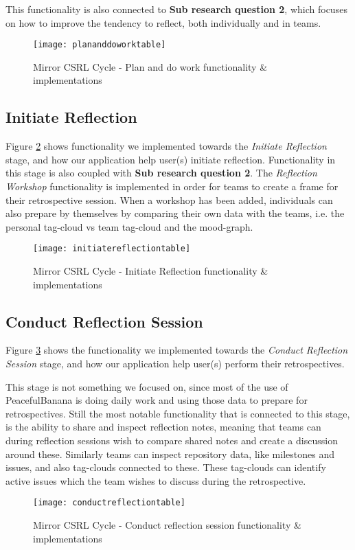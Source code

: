 This functionality is also connected to \textbf{Sub research question 2}, which focuses on how to improve the tendency to reflect, both individually and in teams. 
\begin{figure}[H]
\centering
    \texttt{[image: plananddoworktable]}
\caption{Mirror CSRL Cycle - Plan and do work functionality \& implementations}
\label{plananddoworktable}
\end{figure}

\subsection{Initiate Reflection}
Figure \ref{initiatereflectiontable} shows functionality we implemented towards the \emph{Initiate Reflection} stage, and how our application help user(s) initiate reflection. Functionality in this stage is also coupled with \textbf{Sub research question 2}. The \emph{Reflection Workshop} functionality is implemented in order for teams to create a frame for their retrospective session. When a workshop has been added, individuals can also prepare by themselves by comparing their own data with the teams, i.e. the personal tag-cloud vs team tag-cloud and the mood-graph.  
\begin{figure}[H]
\centering
    \texttt{[image: initiatereflectiontable]}
\caption{Mirror CSRL Cycle - Initiate Reflection functionality \& implementations}
\label{initiatereflectiontable}
\end{figure}

\subsection{Conduct Reflection Session}
Figure \ref{conductreflectiontable} shows the functionality we implemented towards the \emph{Conduct Reflection Session} stage, and how our application help user(s) perform their retrospectives. 

This stage is not something we focused on, since most of the use of PeacefulBanana is doing daily work and using those data to prepare for retrospectives. Still the most notable functionality that is connected to this stage, is the ability to share and inspect reflection notes, meaning that teams can during reflection sessions wish to compare shared notes and create a discussion around these. Similarly teams can inspect repository data, like milestones and issues, and also tag-clouds connected to these. These tag-clouds can identify active issues which the team wishes to discuss during the retrospective. 
\begin{figure}[H]
\centering
    \texttt{[image: conductreflectiontable]}
\caption{Mirror CSRL Cycle - Conduct reflection session functionality \& implementations}
\label{conductreflectiontable}
\end{figure}

